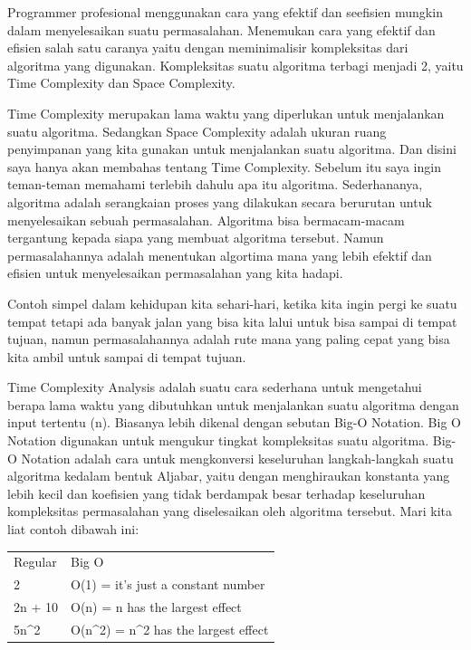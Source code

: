 Programmer profesional menggunakan cara yang efektif dan seefisien mungkin dalam menyelesaikan suatu permasalahan. Menemukan cara yang efektif dan efisien salah satu caranya yaitu dengan meminimalisir kompleksitas dari algoritma yang digunakan.
Kompleksitas suatu algoritma terbagi menjadi 2, yaitu Time Complexity dan Space Complexity.

Time Complexity merupakan lama waktu yang diperlukan untuk menjalankan suatu algoritma. Sedangkan Space Complexity adalah ukuran ruang penyimpanan yang kita gunakan untuk menjalankan suatu algoritma. Dan disini saya hanya akan membahas tentang Time Complexity. Sebelum itu saya ingin teman-teman memahami terlebih dahulu apa itu algoritma. Sederhananya, algoritma adalah serangkaian proses yang dilakukan secara berurutan untuk menyelesaikan sebuah permasalahan. Algoritma bisa bermacam-macam tergantung kepada siapa yang membuat algoritma tersebut. Namun permasalahannya adalah menentukan algortima mana yang lebih efektif dan efisien untuk menyelesaikan permasalahan yang kita hadapi.

Contoh simpel dalam kehidupan kita sehari-hari, ketika kita ingin pergi ke suatu tempat tetapi ada banyak jalan yang bisa kita lalui untuk bisa sampai di tempat tujuan, namun permasalahannya adalah rute mana yang paling cepat yang bisa kita ambil untuk sampai di tempat tujuan.

Time Complexity Analysis adalah suatu cara sederhana untuk mengetahui berapa lama waktu yang dibutuhkan untuk menjalankan suatu algoritma dengan input tertentu (n). Biasanya lebih dikenal dengan sebutan Big-O Notation. Big O Notation digunakan untuk mengukur tingkat kompleksitas suatu algoritma. Big-O Notation adalah cara untuk mengkonversi keseluruhan langkah-langkah suatu algoritma kedalam bentuk Aljabar, yaitu dengan menghiraukan konstanta yang lebih kecil dan koefisien yang tidak berdampak besar terhadap keseluruhan kompleksitas permasalahan yang diselesaikan oleh algoritma tersebut. Mari kita liat contoh dibawah ini:

\begin{table}[]
\begin{tabular}{ll}
Regular               & Big O                                                                 \\
2                     & O(1) = it's just a constant number                                    \\
2n + 10               & O(n) = n has the largest effect                                       \\
5n\textasciicircum{}2 & O(n\textasciicircum{}2) = n\textasciicircum{}2 has the largest effect
\end{tabular}
\end{table}

